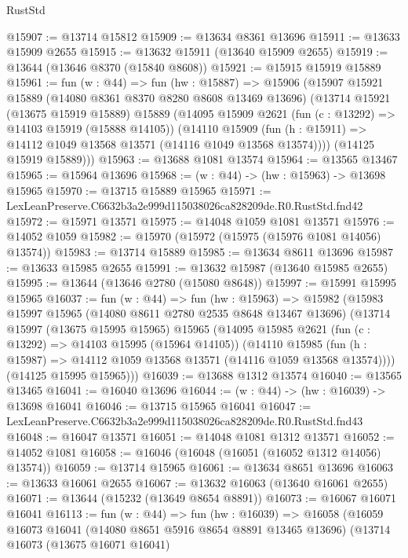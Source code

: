 \begin{lexlean}{RustStd}
\begin{coremodule}
@15907 := @13714 @15812
@15909 := @13634 @8361 @13696
@15911 := @13633 @15909 @2655
@15915 := @13632 @15911 (@13640 @15909 @2655)
@15919 := @13644 (@13646 @8370 (@15840 @8608))
@15921 := @15915 @15919 @15889
@15961 := fun (w : @44) =>
  fun (hw : @15887) =>
  @15906
    (@15907
      @15921
      @15889
      (@14080 @8361 @8370 @8280 @8608 @13469 @13696)
      (@13714
        @15921
        (@13675 @15919 @15889)
        @15889
        (@14095
          @15909
          @2621
          (fun (c : @13292) => @14103 @15919 (@15888 @14105))
          (@14110
            @15909
            (fun (h : @15911) => @14112 @1049 @13568 @13571 (@14116 @1049 @13568 @13574))))
        (@14125 @15919 @15889)))
@15963 := @13688 @1081 @13574
@15964 := @13565 @13467
@15965 := @15964 @13696
@15968 := (w : @44) -> (hw : @15963) -> @13698 @15965
@15970 := @13715 @15889 @15965
@15971 := LexLeanPreserve.C6632b3a2e999d115038026ca828209de.R0.RustStd.fnd42
@15972 := @15971 @13571
@15975 := @14048 @1059 @1081 @13571
@15976 := @14052 @1059
@15982 := @15970 (@15972 (@15975 (@15976 @1081 @14056) @13574))
@15983 := @13714 @15889
@15985 := @13634 @8611 @13696
@15987 := @13633 @15985 @2655
@15991 := @13632 @15987 (@13640 @15985 @2655)
@15995 := @13644 (@13646 @2780 (@15080 @8648))
@15997 := @15991 @15995 @15965
@16037 := fun (w : @44) =>
  fun (hw : @15963) =>
  @15982
    (@15983
      @15997
      @15965
      (@14080 @8611 @2780 @2535 @8648 @13467 @13696)
      (@13714
        @15997
        (@13675 @15995 @15965)
        @15965
        (@14095
          @15985
          @2621
          (fun (c : @13292) => @14103 @15995 (@15964 @14105))
          (@14110
            @15985
            (fun (h : @15987) => @14112 @1059 @13568 @13571 (@14116 @1059 @13568 @13574))))
        (@14125 @15995 @15965)))
@16039 := @13688 @1312 @13574
@16040 := @13565 @13465
@16041 := @16040 @13696
@16044 := (w : @44) -> (hw : @16039) -> @13698 @16041
@16046 := @13715 @15965 @16041
@16047 := LexLeanPreserve.C6632b3a2e999d115038026ca828209de.R0.RustStd.fnd43
@16048 := @16047 @13571
@16051 := @14048 @1081 @1312 @13571
@16052 := @14052 @1081
@16058 := @16046 (@16048 (@16051 (@16052 @1312 @14056) @13574))
@16059 := @13714 @15965
@16061 := @13634 @8651 @13696
@16063 := @13633 @16061 @2655
@16067 := @13632 @16063 (@13640 @16061 @2655)
@16071 := @13644 (@15232 (@13649 @8654 @8891))
@16073 := @16067 @16071 @16041
@16113 := fun (w : @44) =>
  fun (hw : @16039) =>
  @16058
    (@16059
      @16073
      @16041
      (@14080 @8651 @5916 @8654 @8891 @13465 @13696)
      (@13714
        @16073
        (@13675 @16071 @16041)

\end{coremodule}
\end{lexlean}
